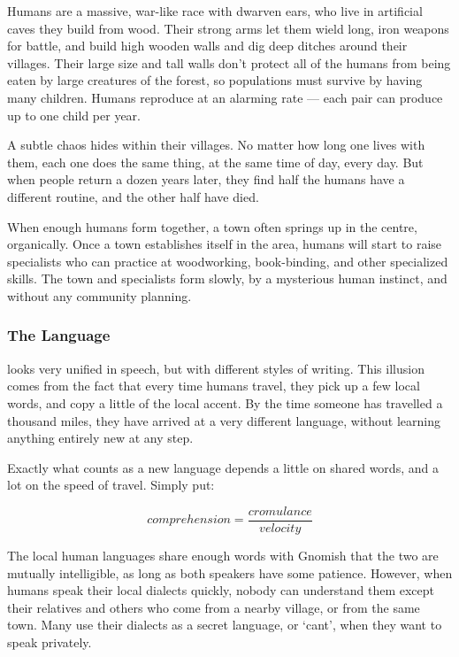 \label{humanTowns}

\renewcommand\npcsymbol{\Hu}

\noindent
Humans are a massive, war-like race with dwarven ears, who live in artificial
caves they build from wood.  Their strong arms let them wield long, iron
weapons for battle, and build high wooden walls and dig deep ditches around
their \glspl{village}.  Their large size and tall walls don't protect all of
the humans from being eaten by large creatures of the forest, so populations
must survive by having many children.  Humans reproduce at an alarming rate ---
each pair can produce up to one child per year.

A subtle chaos hides within their \glspl{village}.  No matter how long one
lives with them, each one does the same thing, at the same time of day, every
day.  But when people return a dozen years later, they find half the humans
have a different routine, and the other half have died.

When enough humans form together, a town often springs up in the centre,
organically.  Once a town establishes itself in the area, humans will start to
raise specialists who can practice at woodworking, book-binding, and other
specialized skills.  The town and specialists form slowly, by a mysterious
human instinct, and without any community planning.


\subsubsection[The Human Language]{The Language}
looks very unified in speech, but with different styles of writing.
This illusion comes from the fact that every time humans travel, they pick up a few local words, and copy a little of the local accent.
By the time someone has travelled a thousand miles, they have arrived at a very different language, without learning anything entirely new at any step.

Exactly what counts as a new language depends a little on shared words, and a lot on the speed of travel.
Simply put:

$$ comprehension = \frac{cromulance}{velocity} $$

The local human languages share enough words with Gnomish that the two are mutually intelligible, as long as both speakers have some patience.
However, when humans speak their local dialects quickly, nobody can understand them except their relatives and others who come from a nearby \gls{village}, or from the same town.
Many use their dialects as a secret language, or `cant', when they want to speak privately.

